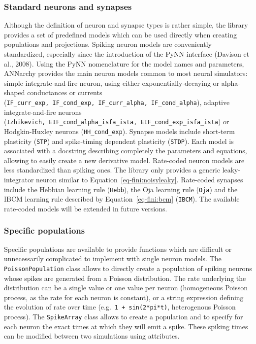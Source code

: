 \documentclass[
  11pt,
  a4paper,
]{scrbook}
\begin{document}
\subsubsection*{Standard neurons and
synapses}\label{standard-neurons-and-synapses}

Although the definition of neuron and synapse types is rather simple,
the library provides a set of predefined models which can be used
directly when creating populations and projections. Spiking neuron
models are conveniently standardized, especially since the introduction
of the PyNN interface (Davison et al., 2008). Using the PyNN
nomenclature for the model names and parameters, ANNarchy provides the
main neuron models common to most neural simulators: simple
integrate-and-fire neuron, using either exponentially-decaying or
alpha-shaped conductances or currents
(\texttt{IF\_curr\_exp,\ IF\_cond\_exp,\ IF\_curr\_alpha,\ IF\_cond\_alpha}),
adaptive integrate-and-fire neurons
(\texttt{Izhikevich,\ EIF\_cond\_alpha\_isfa\_ista,\ EIF\_cond\_exp\_isfa\_ista})
or Hodgkin-Huxley neurons (\texttt{HH\_cond\_exp}). Synapse models
include short-term plasticity (\texttt{STP}) and spike-timing dependent
plasticity (\texttt{STDP}). Each model is associated with a docstring
describing completely the parameters and equations, allowing to easily
create a new derivative model. Rate-coded neuron models are less
standardized than spiking ones. The library only provides a generic
leaky-integrator neuron similar to Equation~\ref{eq-fini:noisyleaky}.
Rate-coded synapses include the Hebbian learning rule (\texttt{Hebb}),
the Oja learning rule (\texttt{Oja}) and the IBCM learning rule
described by Equation~\ref{eq-fini:bcm} (\texttt{IBCM}). The available
rate-coded models will be extended in future versions.

\subsubsection*{Specific populations}\label{specific-populations}

Specific populations are available to provide functions which are
difficult or unnecessarily complicated to implement with single neuron
models. The \texttt{PoissonPopulation} class allows to directly create a
population of spiking neurons whose spikes are generated from a Poisson
distribution. The rate underlying the distribution can be a single value
or one value per neuron (homogeneous Poisson process, as the rate for
each neuron is constant), or a string expression defining the evolution
of rate over time
(e.g.~\texttt{\textquotesingle{}1\ +\ sin(2*pi*t)\textquotesingle{}},
heterogenous Poisson process). The \texttt{SpikeArray} class allows to
create a population and to specify for each neuron the exact times at
which they will emit a spike. These spiking times can be modified
between two simulations using attributes.
\end{document}
